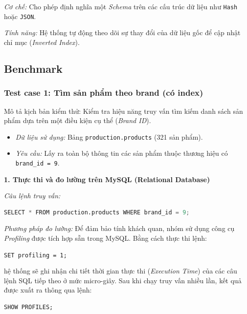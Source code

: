 \textit{Cơ chế:} Cho phép định nghĩa một \textit{Schema} trên các cấu trúc
dữ liệu như \texttt{Hash} hoặc \texttt{JSON}.

\textit{Tính năng:} Hệ thống tự động theo dõi sự thay đổi của dữ liệu gốc
để cập nhật chỉ mục (\textit{Inverted Index}).



\subsection{Benchmark}
\subsubsection{Test case 1: Tìm sản phẩm theo brand (có index)}

\leavevmode\par
\vspace{0.5em}

Mô tả kịch bản kiểm thử: Kiểm tra hiệu năng truy vấn tìm kiếm danh sách sản phẩm dựa trên một điều kiện
cụ thể (\textit{Brand ID}).

\begin{itemize}
    \item \textit{Dữ liệu sử dụng:} Bảng \texttt{production.products} (321 sản phẩm).
    \item \textit{Yêu cầu:} Lấy ra toàn bộ thông tin các sản phẩm thuộc thương hiệu có
\texttt{brand\_id = 9}.
\end{itemize}

\vspace{0.5em}

\noindent\textbf{1. Thực thi và đo lường trên MySQL (Relational Database)}

\textit{Câu lệnh truy vấn:}
\begin{lstlisting}[language=Python, basicstyle=\ttfamily\small, breaklines=true, frame=single]
SELECT * FROM production.products WHERE brand_id = 9;
\end{lstlisting}

\textit{Phương pháp đo lường:} Để đảm bảo tính khách quan, nhóm sử dụng công cụ
\textit{Profiling} được tích hợp sẵn trong MySQL. Bằng cách thực thi lệnh:

\texttt{SET profiling = 1;}

hệ thống sẽ ghi nhận chi tiết thời gian thực thi (\textit{Execution Time})
của các câu lệnh SQL tiếp theo ở mức micro-giây. Sau khi chạy truy vấn nhiều lần,
kết quả được xuất ra thông qua lệnh:

\texttt{SHOW PROFILES;}

